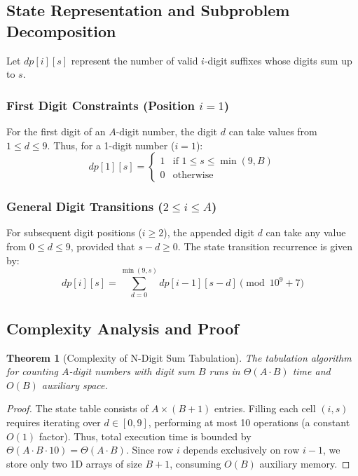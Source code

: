 \documentclass[10pt,journal,compsoc,onecolumn]{IEEEtran}
\newtheorem{theorem}{Theorem}
\begin{document}
\subsection{State Representation and Subproblem Decomposition}

Let $dp[i][s]$ represent the number of valid $i$-digit suffixes whose digits sum up to $s$.

\subsubsection{First Digit Constraints (Position $i = 1$)}
For the first digit of an $A$-digit number, the digit $d$ can take values from $1 \le d \le 9$. Thus, for a 1-digit number ($i = 1$):
\begin{equation}
dp[1][s] = \begin{cases} 
1 & \text{if } 1 \le s \le \min(9, B) \\
0 & \text{otherwise}
\end{cases}
\label{eq:n-digit-base}
\end{equation}

\subsubsection{General Digit Transitions ($2 \le i \le A$)}
For subsequent digit positions ($i \ge 2$), the appended digit $d$ can take any value from $0 \le d \le 9$, provided that $s - d \ge 0$. The state transition recurrence is given by:
\begin{equation}
dp[i][s] = \sum_{d=0}^{\min(9, s)} dp[i-1][s - d] \pmod{10^9 + 7}
\label{eq:n-digit-rec}
\end{equation}

\subsection{Complexity Analysis and Proof}

\begin{theorem}[Complexity of N-Digit Sum Tabulation]
The tabulation algorithm for counting $A$-digit numbers with digit sum $B$ runs in $\Theta(A \cdot B)$ time and $O(B)$ auxiliary space.
\end{theorem}

\begin{proof}
The state table consists of $A \times (B+1)$ entries. Filling each cell $(i, s)$ requires iterating over $d \in [0, 9]$, performing at most 10 operations (a constant $O(1)$ factor). Thus, total execution time is bounded by $\Theta(A \cdot B \cdot 10) = \Theta(A \cdot B)$. Since row $i$ depends exclusively on row $i-1$, we store only two 1D arrays of size $B+1$, consuming $O(B)$ auxiliary memory.
\end{proof}
\end{document}
